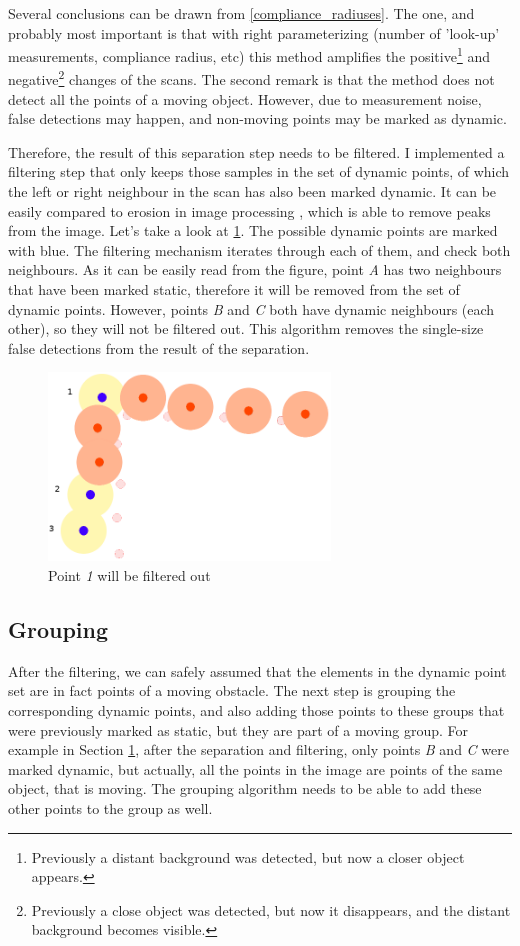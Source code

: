 Several conclusions can be drawn from \ref{compliance_radiuses}. The one, and probably most important is that with right parameterizing (number of 'look-up' measurements, compliance radius, etc) this method amplifies the positive\footnote{Previously a distant background was detected, but now a closer object appears.} and negative\footnote{Previously a close object was detected, but now it disappears, and the distant background becomes visible.} changes of the scans. The second remark is that the method does not detect all the points of a moving object. However, due to measurement noise, false detections may happen, and non-moving points may be marked as dynamic.

Therefore, the result of this separation step needs to be filtered. I implemented a filtering step that only keeps those samples in the set of dynamic points, of which the left or right neighbour in the scan has also been marked dynamic. It can be easily compared to erosion in image processing \cite{wiki_erosion}, which is able to remove peaks from the image. Let's take a look at \ref{dynamic_points}. The possible dynamic points are marked with blue. The filtering mechanism iterates through each of them, and check both neighbours. As it can be easily read from the figure, point \textit{A} has two neighbours that have been marked static, therefore it will be removed from the set of dynamic points. However, points \textit{B} and \textit{C} both have dynamic neighbours (each other), so they will not be filtered out. This algorithm removes the single-size false detections from the result of the separation.

\begin{figure}[!ht]
    \centering
    \includegraphics[height=50mm]{figures/raw/dynamic_points.png}
    \caption{Point \textit{1} will be filtered out}
    \label{dynamic_points}
\end{figure}

\subsection{Grouping}
After the filtering, we can safely assumed that the elements in the dynamic point set are in fact points of a moving obstacle. The next step is grouping the corresponding dynamic points, and also adding those points to these groups that were previously marked as static, but they are part of a moving group. For example in Section \ref{dynamic_points}, after the separation and filtering, only points \textit{B} and \textit{C} were marked dynamic, but actually, all the points in the image are points of the same object, that is moving. The grouping algorithm needs to be able to add these other points to the group as well.

